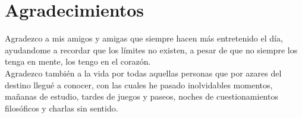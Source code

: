 \chapter{Agradecimientos}
Agradezco a mis amigos y amigas que siempre
hacen más entretenido el día, ayudandome a recordar
que los límites no existen, a pesar de que no siempre
los tenga en mente, los tengo en el corazón.\\

Agradezco también a la vida por todas aquellas personas 
que por azares del destino llegué a conocer, con las 
cuales he pasado inolvidables momentos, mañanas de estudio,
tardes de juegos y paseos, noches de cuestionamientos 
filosóficos y charlas sin sentido.\\